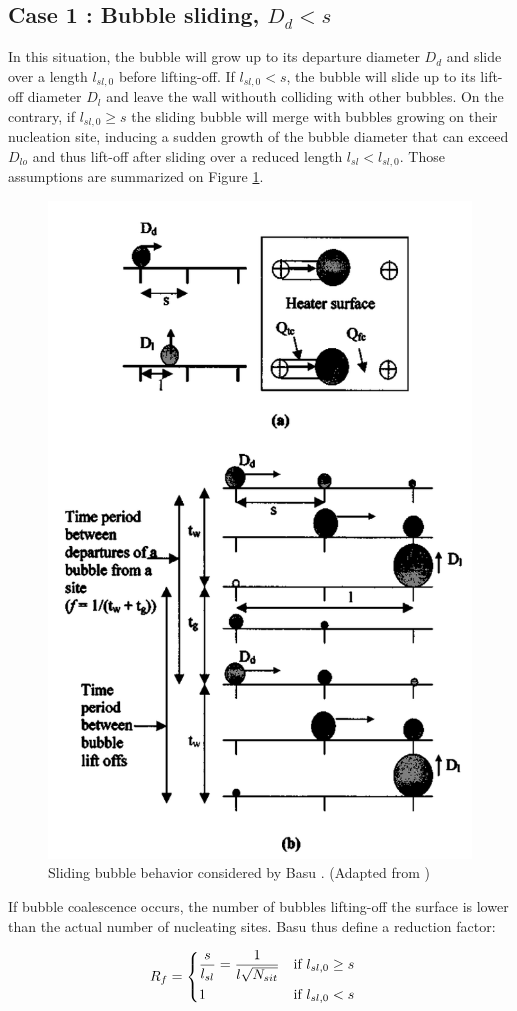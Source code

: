 \subsection{Case 1 : Bubble sliding, $D_{d}<s$}

In this situation, the bubble will grow up to its departure diameter $D_{d}$ and slide over a length $l_{sl,0}$ before lifting-off. If $l_{sl,0}<s$, the bubble will slide up to its lift-off diameter $D_{l}$ and leave the wall withouth colliding with other bubbles. On the contrary, if $l_{sl,0}\geq s$ the sliding bubble will merge with bubbles growing on their nucleation site, inducing a sudden growth of the bubble diameter that can exceed $D_{lo}$ and thus lift-off after sliding over a reduced length $l_{sl}<l_{sl,0}$. Those assumptions are summarized on Figure \ref{fig:Basu_sliding}.

\begin{figure}[h]
\centering
\includegraphics[width=0.5\linewidth]{img/HFP/Basu/slide.PNG}
\caption{Sliding bubble behavior considered by Basu \etal. (Adapted from \cite{basu2005})}
\label{fig:Basu_sliding}
\end{figure}
	

If bubble coalescence occurs, the number of bubbles lifting-off the surface is lower than the actual number of nucleating sites. Basu \etal thus define a reduction factor:

\begin{align}
R_{f}&=
\begin{dcases}
\dfrac{s}{l_{sl}} = \dfrac{1}{l\sqrt{N_{sit}}} & \text{if } l_{sl,0} \geq s \\
1 & \text{if } l_{sl,0}<s
\end{dcases}
\label{eq:HFP_B_Rf}
\end{align}  


